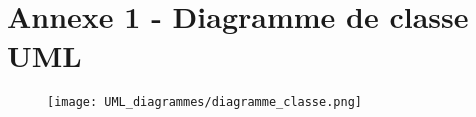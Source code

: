 \documentclass[11pt]{article}
\begin{document}

\appendix  %
\section*{Annexe 1 - Diagramme de classe UML}


\begin{figure}[H]
    \label{UML_classes}
    \centering
    \texttt{[image: UML\_diagrammes/diagramme\_classe.png]}
\end{figure}


\restoregeometry
\end{document}
